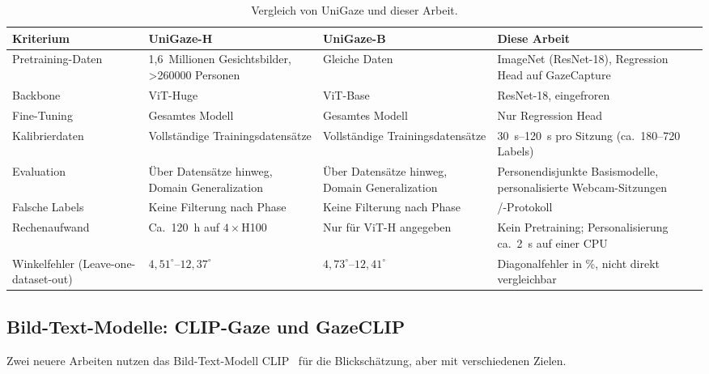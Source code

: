 \begin{table}[htbp]
  \centering
  \small
  \caption{Vergleich von UniGaze und dieser Arbeit.}
  \label{tab:unigaze_vergleich}
  \begin{tabularx}{\textwidth}{L{2.8cm} L{3.2cm} L{2.6cm} Y}
    \toprule
    \textbf{Kriterium} & \textbf{UniGaze-H} & \textbf{UniGaze-B} & \textbf{Diese Arbeit} \\
    \midrule
    Pretraining-Daten & 1,6~Millionen Gesichtsbilder, >\num{260000} Personen & Gleiche Daten & ImageNet (ResNet-18), Regression Head auf GazeCapture \\
    Backbone & ViT-Huge & ViT-Base & ResNet-18, eingefroren \\
    Fine-Tuning & Gesamtes Modell & Gesamtes Modell & Nur Regression Head \\
    Kalibrierdaten & Vollständige Trainingsdatensätze & Vollständige Trainingsdatensätze & \SIrange{30}{120}{\second} pro Sitzung (ca.\ 180--720 Labels) \\
    Evaluation & Über Datensätze hinweg, Domain Gene\-rali\-zation & Über Datensätze hinweg, Domain Gene\-rali\-zation & Personendisjunkte Basismodelle, personalisierte Webcam-Sitzungen \\
    Falsche Labels & Keine Filterung nach Phase & Keine Filterung nach Phase & /-Protokoll \\
    Rechenaufwand & Ca.\ \SI{120}{\hour} auf $4\times$H100 & Nur für ViT-H angegeben & Kein Pretraining; Personalisierung ca.\ \SI{2}{\second} auf einer CPU \\
    Winkelfehler (Leave-one-dataset-out) & $4,51^\circ$--$12,37^\circ$ & $4,73^\circ$--$12,41^\circ$ & Diagonalfehler in \%, nicht direkt vergleichbar \\
    \bottomrule
  \end{tabularx}
\end{table}

\subsection{Bild-Text-Modelle: CLIP-Gaze und GazeCLIP}
\label{subsec:clip}
Zwei neuere Arbeiten nutzen das Bild-Text-Modell CLIP~\cite{radford2021clip}
für die Blickschätzung, aber mit verschiedenen Zielen.

